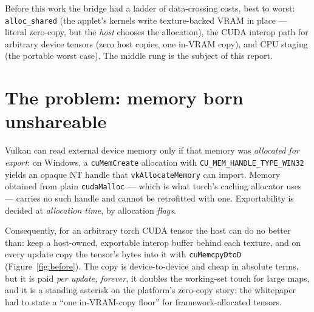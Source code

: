 \documentclass[11pt]{article}
\begin{document}
Before this work the bridge had a ladder of data-crossing costs, best to
worst: \texttt{alloc\_shared} (the applet's kernels write texture-backed VRAM
in place --- literal zero-copy, but the \emph{host} chooses the allocation),
the CUDA interop path for arbitrary device tensors (zero host copies, one
in-VRAM copy), and CPU staging (the portable worst case). The middle rung is
the subject of this report.

\section{The problem: memory born unshareable}

Vulkan can read external device memory only if that memory was
\emph{allocated for export}: on Windows, a \texttt{cuMemCreate} allocation
with \texttt{CU\_MEM\_HANDLE\_TYPE\_WIN32} yields an opaque NT handle that
\texttt{vkAllocateMemory} can import. Memory obtained from plain
\texttt{cudaMalloc} --- which is what torch's caching allocator uses ---
carries no such handle and cannot be retrofitted with one. Exportability is
decided at \emph{allocation time}, by allocation \emph{flags}.

Consequently, for an arbitrary torch CUDA tensor the host can do no better
than: keep a host-owned, exportable interop buffer behind each texture, and
on every update copy the tensor's bytes into it with \texttt{cuMemcpyDtoD}
(Figure~\ref{fig:before}). The copy is device-to-device and cheap in absolute
terms, but it is paid \emph{per update, forever}, it doubles the working-set
touch for large maps, and it is a standing asterisk on the platform's
zero-copy story: the whitepaper had to state a ``one in-VRAM-copy floor'' for
framework-allocated tensors.
\end{document}
